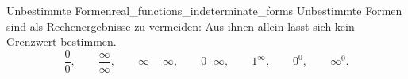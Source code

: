 \begin{KeyPointBox}{Unbestimmte Formen}{real_functions_indeterminate_forms}
  Unbestimmte Formen  sind als Rechenergebnisse zu vermeiden:
  Aus ihnen allein lässt sich kein Grenzwert bestimmen.
  \[
    \frac00,\qquad\frac\infty\infty,\qquad\infty-\infty,
    \qquad0\cdot\infty,\qquad1^\infty,\qquad0^0,\qquad\infty^0.
  \]
\end{KeyPointBox}

